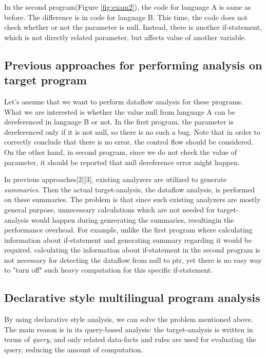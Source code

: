 In the second program(Figure \ref{fig:exam2}), the code for language A is same
as before. The difference is in code for language B. This time, the code does
not check whether or not the parameter is null. Instead, there is another
if-statement, which is not directly related parameter, but affects value of
  another variable.

\subsection{Previous approaches for performing analysis on target program}

Let's assume that we want to perform dataflow analysis for these programs.
What we are interested is whether the value null from language A can be
dereferenced in language B or not. In the first program, the parameter is
dereferenced only if it is not null, so there is no such a bug. Note that in
order to correctly conclude that there is no error, the control flow should be
considered. On the other hand, in second program, since we do not check the
value of parameter, it should be reported that null dereference error might
happen.

In previous approaches[2][3], existing analyzers are utilized to generate
\textit{summaries}. Then the actual target-analysis, the dataflow analysis, is
performed on these summaries. The problem is that since such existing analyzers
are mostly general purpose, unnecessary calculations which are not needed for
target-analysis would happen during genrerating the summaries, resultingin the
performance overhead. For example, unlike the first program where calculating
information about if-statement and generating summary regarding it
would be required. calculating the information about if-statement in the second
program is not necessary for detecting the dataflow from null to ptr, yet there
is no easy way to "turn off" such heavy computation for this specific
if-statement.

\subsection{Declarative style multilingual program analysis}

By using declarative style analysis, we can solve the problem mentioned above.
The main reason is in its query-based analysis: the target-analysis is
written in terms of \textit{query}, and only related data-facts and rules
are used for evaluating the query, reducing the amount of computation.

